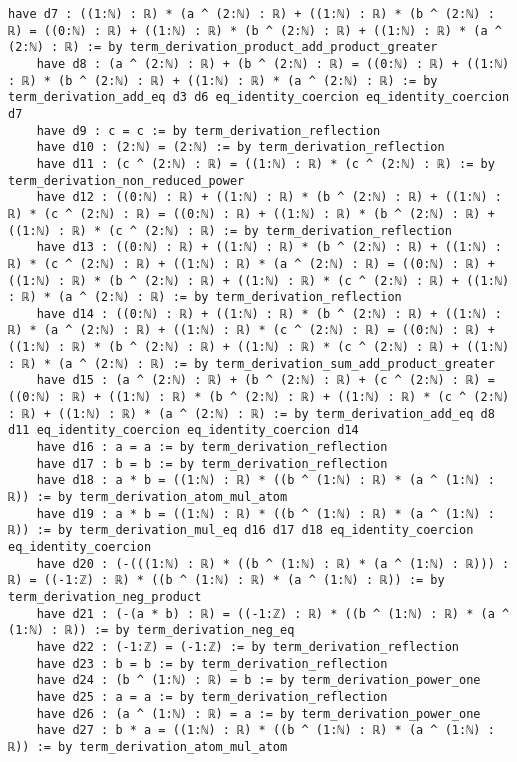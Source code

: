 \documentclass{article}
\begin{document}
\begin{tcolorbox}[colback=white!10, width=\linewidth]
\begin{lstlisting}[language=Lean4]
    have d7 : ((1:ℕ) : ℝ) * (a ^ (2:ℕ) : ℝ) + ((1:ℕ) : ℝ) * (b ^ (2:ℕ) : ℝ) = ((0:ℕ) : ℝ) + ((1:ℕ) : ℝ) * (b ^ (2:ℕ) : ℝ) + ((1:ℕ) : ℝ) * (a ^ (2:ℕ) : ℝ) := by term_derivation_product_add_product_greater
    have d8 : (a ^ (2:ℕ) : ℝ) + (b ^ (2:ℕ) : ℝ) = ((0:ℕ) : ℝ) + ((1:ℕ) : ℝ) * (b ^ (2:ℕ) : ℝ) + ((1:ℕ) : ℝ) * (a ^ (2:ℕ) : ℝ) := by term_derivation_add_eq d3 d6 eq_identity_coercion eq_identity_coercion d7
    have d9 : c = c := by term_derivation_reflection
    have d10 : (2:ℕ) = (2:ℕ) := by term_derivation_reflection
    have d11 : (c ^ (2:ℕ) : ℝ) = ((1:ℕ) : ℝ) * (c ^ (2:ℕ) : ℝ) := by term_derivation_non_reduced_power
    have d12 : ((0:ℕ) : ℝ) + ((1:ℕ) : ℝ) * (b ^ (2:ℕ) : ℝ) + ((1:ℕ) : ℝ) * (c ^ (2:ℕ) : ℝ) = ((0:ℕ) : ℝ) + ((1:ℕ) : ℝ) * (b ^ (2:ℕ) : ℝ) + ((1:ℕ) : ℝ) * (c ^ (2:ℕ) : ℝ) := by term_derivation_reflection
    have d13 : ((0:ℕ) : ℝ) + ((1:ℕ) : ℝ) * (b ^ (2:ℕ) : ℝ) + ((1:ℕ) : ℝ) * (c ^ (2:ℕ) : ℝ) + ((1:ℕ) : ℝ) * (a ^ (2:ℕ) : ℝ) = ((0:ℕ) : ℝ) + ((1:ℕ) : ℝ) * (b ^ (2:ℕ) : ℝ) + ((1:ℕ) : ℝ) * (c ^ (2:ℕ) : ℝ) + ((1:ℕ) : ℝ) * (a ^ (2:ℕ) : ℝ) := by term_derivation_reflection
    have d14 : ((0:ℕ) : ℝ) + ((1:ℕ) : ℝ) * (b ^ (2:ℕ) : ℝ) + ((1:ℕ) : ℝ) * (a ^ (2:ℕ) : ℝ) + ((1:ℕ) : ℝ) * (c ^ (2:ℕ) : ℝ) = ((0:ℕ) : ℝ) + ((1:ℕ) : ℝ) * (b ^ (2:ℕ) : ℝ) + ((1:ℕ) : ℝ) * (c ^ (2:ℕ) : ℝ) + ((1:ℕ) : ℝ) * (a ^ (2:ℕ) : ℝ) := by term_derivation_sum_add_product_greater
    have d15 : (a ^ (2:ℕ) : ℝ) + (b ^ (2:ℕ) : ℝ) + (c ^ (2:ℕ) : ℝ) = ((0:ℕ) : ℝ) + ((1:ℕ) : ℝ) * (b ^ (2:ℕ) : ℝ) + ((1:ℕ) : ℝ) * (c ^ (2:ℕ) : ℝ) + ((1:ℕ) : ℝ) * (a ^ (2:ℕ) : ℝ) := by term_derivation_add_eq d8 d11 eq_identity_coercion eq_identity_coercion d14
    have d16 : a = a := by term_derivation_reflection
    have d17 : b = b := by term_derivation_reflection
    have d18 : a * b = ((1:ℕ) : ℝ) * ((b ^ (1:ℕ) : ℝ) * (a ^ (1:ℕ) : ℝ)) := by term_derivation_atom_mul_atom
    have d19 : a * b = ((1:ℕ) : ℝ) * ((b ^ (1:ℕ) : ℝ) * (a ^ (1:ℕ) : ℝ)) := by term_derivation_mul_eq d16 d17 d18 eq_identity_coercion eq_identity_coercion
    have d20 : (-(((1:ℕ) : ℝ) * ((b ^ (1:ℕ) : ℝ) * (a ^ (1:ℕ) : ℝ))) : ℝ) = ((-1:ℤ) : ℝ) * ((b ^ (1:ℕ) : ℝ) * (a ^ (1:ℕ) : ℝ)) := by term_derivation_neg_product
    have d21 : (-(a * b) : ℝ) = ((-1:ℤ) : ℝ) * ((b ^ (1:ℕ) : ℝ) * (a ^ (1:ℕ) : ℝ)) := by term_derivation_neg_eq
    have d22 : (-1:ℤ) = (-1:ℤ) := by term_derivation_reflection
    have d23 : b = b := by term_derivation_reflection
    have d24 : (b ^ (1:ℕ) : ℝ) = b := by term_derivation_power_one
    have d25 : a = a := by term_derivation_reflection
    have d26 : (a ^ (1:ℕ) : ℝ) = a := by term_derivation_power_one
    have d27 : b * a = ((1:ℕ) : ℝ) * ((b ^ (1:ℕ) : ℝ) * (a ^ (1:ℕ) : ℝ)) := by term_derivation_atom_mul_atom

\end{lstlisting}
\end{tcolorbox}
\end{document}
